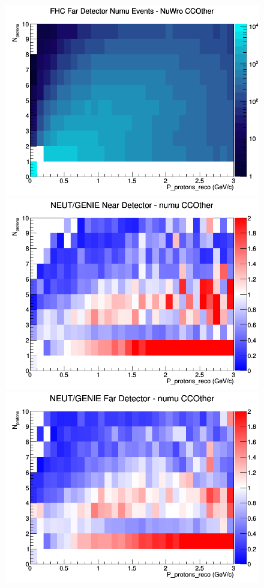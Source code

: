 \begin{figure}[h]
\endminipage
{}
\includegraphics[width=\linewidth]{eff_N_P/LAr/protons/CCOther_FHC_FD_numu_N_P_NuWro.png}
\endminipage
\newline
{}
\includegraphics[width=\linewidth]{eff_N_P/LAr/protons/ratios/CCOther_NEUT_GENIE_numu_near_N_P.png}
\endminipage
{}
\includegraphics[width=\linewidth]{eff_N_P/LAr/protons/ratios/CCOther_NEUT_GENIE_numu_far_N_P.png}

\end{figure}
